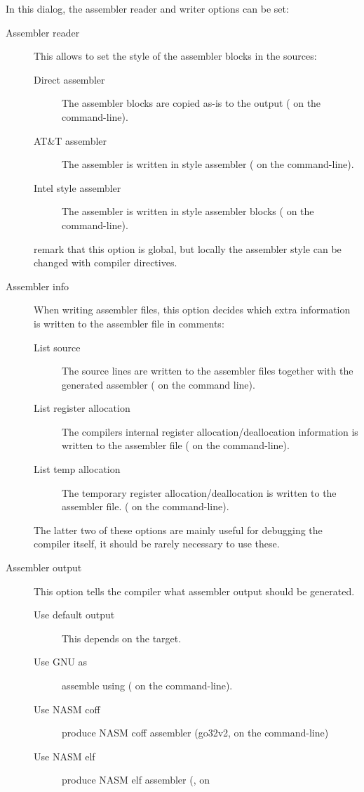 In this dialog, the assembler reader and writer options can be set:
\begin{description}
\item[Assembler reader] This allows to set the style of the assembler blocks
in the sources:
\begin{description}
\item[Direct assembler] The assembler blocks are copied as-is to the output 
( on the command-line).
\item[AT\&T assembler] The assembler is written in  style
assembler ( on the command-line).
\item[Intel style assembler] The assembler is written in  style
assembler blocks ( on the command-line).
\end{description}
remark that this option is global, but locally the assembler style can be
changed with compiler directives. 
\item[Assembler info] When writing assembler files, this option decides
which extra information is written to the assembler file in comments:
\begin{description} 
\item[List source] The source lines are written to the assembler files
together with the generated assembler ( on the command line).
\item[List register allocation] The compilers internal register
allocation/deallocation information is written to the assembler file
( on the command-line).
\item[List temp allocation] The temporary register allocation/deallocation
is written to the assembler file. ( on the command-line).
\end{description}
The latter two of these options are mainly useful for debugging the
compiler itself, it should be rarely necessary to use these.
\item[Assembler output] This option tells the compiler what assembler output
should be generated.
\begin{description}
\item[Use default output] This depends on the target.
\item[Use GNU as] assemble using \gnu {} ( on the
command-line).
\item[Use NASM coff] produce NASM coff assembler (go32v2,  on the
command-line)
\item[Use NASM elf] produce NASM elf assembler (\linux,  on

\end{description}
\end{description}

